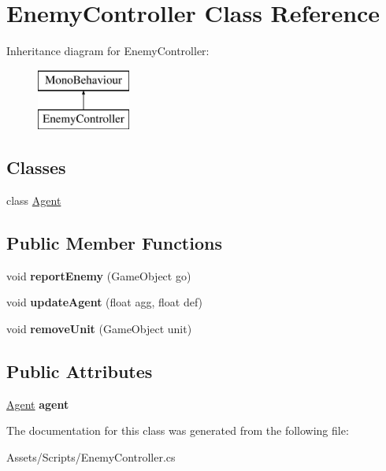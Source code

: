 \hypertarget{class_enemy_controller}{}\section{Enemy\+Controller Class Reference}
\label{class_enemy_controller}
Inheritance diagram for Enemy\+Controller\+:\begin{figure}[H]
\begin{center}
\leavevmode
\includegraphics[height=2.000000cm]{class_enemy_controller}
\end{center}
\end{figure}
\subsection*{Classes}
\begin{DoxyCompactItemize}
\item 
class \hyperlink{class_enemy_controller_1_1_agent}{Agent}
\end{DoxyCompactItemize}
\subsection*{Public Member Functions}
\begin{DoxyCompactItemize}
\item 
\hypertarget{class_enemy_controller_a068a88160e180f49bdc2da319db95b41}{}void {\bfseries report\+Enemy} (Game\+Object go)\label{class_enemy_controller_a068a88160e180f49bdc2da319db95b41}

\item 
\hypertarget{class_enemy_controller_a730852dd7b6474fe350dc9cd791a2f91}{}void {\bfseries update\+Agent} (float agg, float def)\label{class_enemy_controller_a730852dd7b6474fe350dc9cd791a2f91}

\item 
\hypertarget{class_enemy_controller_a9c542aad48c09e7fd588763014010007}{}void {\bfseries remove\+Unit} (Game\+Object unit)\label{class_enemy_controller_a9c542aad48c09e7fd588763014010007}

\end{DoxyCompactItemize}
\subsection*{Public Attributes}
\begin{DoxyCompactItemize}
\item 
\hypertarget{class_enemy_controller_a97ab04e3ac6701654fc012b8c9b0ba31}{}\hyperlink{class_enemy_controller_1_1_agent}{Agent} {\bfseries agent}\label{class_enemy_controller_a97ab04e3ac6701654fc012b8c9b0ba31}

\end{DoxyCompactItemize}


The documentation for this class was generated from the following file\+:\begin{DoxyCompactItemize}
\item 
Assets/\+Scripts/Enemy\+Controller.\+cs\end{DoxyCompactItemize}
